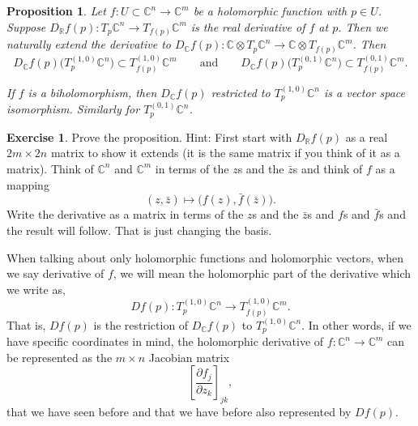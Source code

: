 \documentclass[12pt,openany]{book}
\newcommand{\C}{{\mathbb{C}}}
\newcommand{\R}{{\mathbb{R}}}
\theoremstyle{plain}
\newtheorem{prop}[thm]{Proposition}
\theoremstyle{remark}
\theoremstyle{definition}
\newenvironment{exbox}{%
    \def\FrameCommand{\vrule width 1pt \relax\hspace {10pt}}%
    \MakeFramed {\advance \hsize -\width \FrameRestore }%
}{%
    \endMakeFramed
}
\theoremstyle{exercise}
\newtheorem{exercise}{Exercise}[section]
\theoremstyle{example}
\begin{document}
\begin{prop} \label{prop:holvectmap}
Let $f \colon U \subset \C^n \to \C^m$ be a holomorphic function with
$p \in U$.
Suppose 
$D_\R f(p) \colon T_p\C^n \to T_{f(p)} \C^m$
is the real derivative of $f$ at $p$.
Then we naturally
extend the derivative to $D_\C f(p) \colon \C \otimes T_p\C^n \to \C \otimes  T_{f(p)}
\C^m$.  Then
\begin{equation*}
D_\C f(p)\bigl(T_p^{(1,0)} \C^n\bigr) \subset T_{f(p)}^{(1,0)} \C^m
\qquad \text{and} \qquad
D_\C f(p)\bigl(T_p^{(0,1)} \C^n\bigr) \subset T_{f(p)}^{(0,1)} \C^m .
\end{equation*}

If $f$ is a biholomorphism, then $D_\C f(p)$ restricted to $T_p^{(1,0)} \C^n$
is a vector space isomorphism.  Similarly for $T_p^{(0,1)} \C^n$.
\end{prop}

\begin{exbox}
\begin{exercise}
Prove the proposition.
Hint: First start with $D_\R f(p)$ as a real $2m \times 2n$ matrix to show it
extends (it is the same matrix if you think of it as a matrix).  Think of $\C^n$ and $\C^m$ in terms of the $z$s and the
$\bar{z}$s and think of $f$ as a mapping
\begin{equation*}
(z,\bar{z}) \mapsto \bigl( f(z) , \bar{f}(\bar{z}) \bigr) .
\end{equation*}
Write the derivative as a matrix in terms of the $z$s and the $\bar{z}$s
and $f$s and $\bar{f}$s and the result will follow.  That is just changing
the basis.
\end{exercise}
\end{exbox}

When talking about only holomorphic functions and holomorphic vectors,
when we say derivative of $f$, we will mean the holomorphic part of the
derivative which we write as,
\begin{equation*}
D f(p) \colon T_p^{(1,0)} \C^n \to T_{f(p)}^{(1,0)} \C^m .
\end{equation*}
That is, $Df(p)$ is the restriction of $D_\C f(p)$ to $T_p^{(1,0)} \C^n$.
In other words,
if we have specific coordinates in mind, the
holomorphic derivative of $f \colon \C^{n} \to \C^m$ can be represented
as the $m \times n$ Jacobian matrix
\begin{equation*}
\left[
\frac{\partial f_j}{\partial z_k}
\right]_{jk} ,
\end{equation*}
that we have seen before and that we have before also represented by
$Df(p)$.
\end{document}

